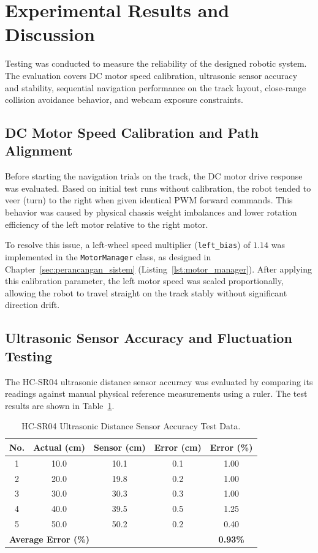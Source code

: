 \section{Experimental Results and Discussion}
\label{sec:pengujian_hasil}

Testing was conducted to measure the reliability of the designed robotic system. The evaluation covers DC motor speed calibration, ultrasonic sensor accuracy and stability, sequential navigation performance on the track layout, close-range collision avoidance behavior, and webcam exposure constraints.

\subsection{DC Motor Speed Calibration and Path Alignment}
Before starting the navigation trials on the track, the DC motor drive response was evaluated. Based on initial test runs without calibration, the robot tended to veer (turn) to the right when given identical PWM forward commands. This behavior was caused by physical chassis weight imbalances and lower rotation efficiency of the left motor relative to the right motor.

To resolve this issue, a left-wheel speed multiplier (\texttt{left\_}\allowbreak\texttt{bias}) of $1.14$ was implemented in the \texttt{MotorManager} class, as designed in Chapter~\ref{sec:perancangan_sistem} (Listing~\ref{lst:motor_manager}). After applying this calibration parameter, the left motor speed was scaled proportionally, allowing the robot to travel straight on the track stably without significant direction drift.

\subsection{Ultrasonic Sensor Accuracy and Fluctuation Testing}
The HC-SR04 ultrasonic distance sensor accuracy was evaluated by comparing its readings against manual physical reference measurements using a ruler. The test results are shown in Table~\ref{tab:pengujian_sensor}.

\begin{table}[H]
    \centering
    \caption{HC-SR04 Ultrasonic Distance Sensor Accuracy Test Data.}
    \label{tab:pengujian_sensor}
    \begin{tabular}{ccccc}
        \toprule
        \textbf{No.} & \textbf{Actual (cm)} & \textbf{Sensor (cm)} & \textbf{Error (cm)} & \textbf{Error (\%)} \\
        \midrule
        1  & 10.0 & 10.1 & 0.1 & 1.00 \\
        2  & 20.0 & 19.8 & 0.2 & 1.00 \\
        3  & 30.0 & 30.3 & 0.3 & 1.00 \\
        4  & 40.0 & 39.5 & 0.5 & 1.25 \\
        5  & 50.0 & 50.2 & 0.2 & 0.40 \\
        \midrule
        \multicolumn{4}{l}{\textbf{Average Error (\%)}} & \textbf{0.93\%} \\
        \bottomrule
    \end{tabular}
\end{table}

